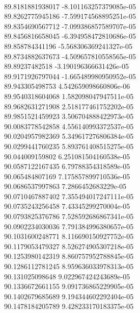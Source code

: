 { \\
89.8181881938017 -8.101163257379085e-05
 \\
89.8262775945186 -7.599174568895251e-05
 \\
89.8354690567712 -7.099386857589707e-05
 \\
89.8456816658045 -6.394958472810686e-05
 \\
89.858784341196 -5.568306369241327e-05
 \\
89.8734882637673 -4.509657810558565e-05
 \\
89.89237482518 -3.190196366631426e-05
 \\
89.9171926797044 -1.665489980950952e-05
 \\
89.943305498753 4.542659098660806e-06
 \\
89.9540318604068 1.582098047947511e-05
 \\
89.9682631271908 2.518177461752202e-05
 \\
89.9851521459923 3.506704888422973e-05
 \\
90.0083778542858 4.556140993372537e-05
 \\
90.0204957982369 5.349617276806384e-05
 \\
90.0299441760235 5.893761408515275e-05
 \\
90.044009159802 6.251081504160538e-05
 \\
90.0587122167435 6.79788354318589e-05
 \\
90.065484807169 7.175857899710536e-05
 \\
90.0686537997863 7.2866452683229e-05
 \\
90.0710467887402 7.355494017247111e-05
 \\
90.0735243256458 7.43345299270004e-05
 \\
90.0793825376786 7.528592686867341e-05
 \\
90.0902234030036 7.791384996380657e-05
 \\
90.1031600248771 8.116690150927752e-05
 \\
90.1179053479327 8.526274905307218e-05
 \\
90.1253980142319 8.860757952788845e-05
 \\
90.1286112781245 8.959636033978313e-05
 \\
90.131025098648 9.022967424243689e-05
 \\
90.1336672661155 9.091736865229905e-05
 \\
90.1402679685689 9.194344602292404e-05
 \\
90.1478184205789 9.428233170183375e-05
 \\
}
